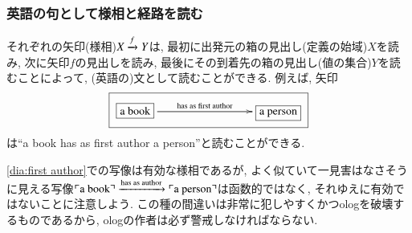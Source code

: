 
\subsubsection{英語の句として様相と経路を読む}


それぞれの矢印(様相)$X\xrightarrow{f} Y$は, 最初に出発元の箱の見出し(定義の始域)$X$を読み, 次に矢印$f$の見出しを読み, 最後にその到着先の箱の見出し(値の集合)$Y$を読むことによって, (英語の)文として読むことができる. 例えば, 矢印\begin{align}\label{dia:first author}\fbox{\xymatrixnocompile{\smbox{}{a book}\LA{rrr}{has as first author}&&&\smbox{}{a person}}}\end{align}は``a book has as first author a person''と読むことができる.

\begin{remark}


\eqref{dia:first author}での写像は有効な様相であるが, よく似ていて一見害はなさそうに見える写像$\fakebox{a book}\To{\tn{has as author}}\fakebox{a person}$は函数的ではなく, それゆえに有効ではないことに注意しよう. この種の間違いは非常に犯しやすくかつologを破壊するものであるから, ologの作者は必ず警戒しなければならない.

\end{remark}


